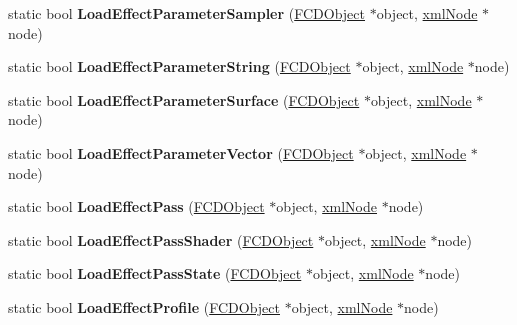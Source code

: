 \begin{DoxyCompactItemize}
\item 
\hypertarget{classFArchiveXML_ac117edb1dbd423e36e2c16f0a0436e49}{
static bool {\bfseries LoadEffectParameterSampler} (\hyperlink{classFCDObject}{FCDObject} $\ast$object, \hyperlink{struct__xmlNode}{xmlNode} $\ast$node)}
\label{classFArchiveXML_ac117edb1dbd423e36e2c16f0a0436e49}

\item 
\hypertarget{classFArchiveXML_a09d5269f821f5200d9d62c9393a66975}{
static bool {\bfseries LoadEffectParameterString} (\hyperlink{classFCDObject}{FCDObject} $\ast$object, \hyperlink{struct__xmlNode}{xmlNode} $\ast$node)}
\label{classFArchiveXML_a09d5269f821f5200d9d62c9393a66975}

\item 
\hypertarget{classFArchiveXML_ac507675658747c50aa09c93df518b500}{
static bool {\bfseries LoadEffectParameterSurface} (\hyperlink{classFCDObject}{FCDObject} $\ast$object, \hyperlink{struct__xmlNode}{xmlNode} $\ast$node)}
\label{classFArchiveXML_ac507675658747c50aa09c93df518b500}

\item 
\hypertarget{classFArchiveXML_a6696c767cda5cf04eee1535b776af176}{
static bool {\bfseries LoadEffectParameterVector} (\hyperlink{classFCDObject}{FCDObject} $\ast$object, \hyperlink{struct__xmlNode}{xmlNode} $\ast$node)}
\label{classFArchiveXML_a6696c767cda5cf04eee1535b776af176}

\item 
\hypertarget{classFArchiveXML_a2251423924d3c0353a07abc15b494297}{
static bool {\bfseries LoadEffectPass} (\hyperlink{classFCDObject}{FCDObject} $\ast$object, \hyperlink{struct__xmlNode}{xmlNode} $\ast$node)}
\label{classFArchiveXML_a2251423924d3c0353a07abc15b494297}

\item 
\hypertarget{classFArchiveXML_a019160d91b921e4a8b2a16310044df3f}{
static bool {\bfseries LoadEffectPassShader} (\hyperlink{classFCDObject}{FCDObject} $\ast$object, \hyperlink{struct__xmlNode}{xmlNode} $\ast$node)}
\label{classFArchiveXML_a019160d91b921e4a8b2a16310044df3f}

\item 
\hypertarget{classFArchiveXML_a853a7dc1f9dcea98145943d0b569f3eb}{
static bool {\bfseries LoadEffectPassState} (\hyperlink{classFCDObject}{FCDObject} $\ast$object, \hyperlink{struct__xmlNode}{xmlNode} $\ast$node)}
\label{classFArchiveXML_a853a7dc1f9dcea98145943d0b569f3eb}

\item 
\hypertarget{classFArchiveXML_a82e1f4d0f14af35527ec2a7fd51ef02f}{
static bool {\bfseries LoadEffectProfile} (\hyperlink{classFCDObject}{FCDObject} $\ast$object, \hyperlink{struct__xmlNode}{xmlNode} $\ast$node)}
\label{classFArchiveXML_a82e1f4d0f14af35527ec2a7fd51ef02f}


\end{DoxyCompactItemize}
